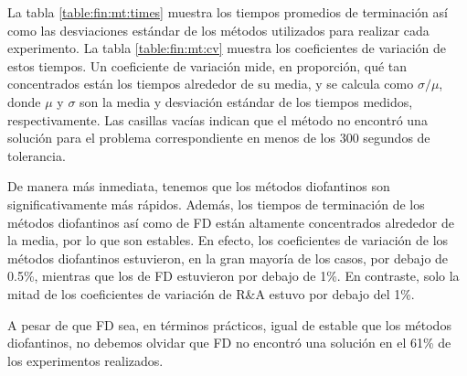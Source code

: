 La tabla \ref{table:fin:mt:times} muestra los tiempos promedios de terminación así como las
desviaciones estándar de los métodos utilizados para realizar cada experimento. La tabla
\ref{table:fin:mt:cv} muestra los coeficientes de variación de estos tiempos. Un coeficiente de
variación mide, en proporción, qué tan concentrados están los tiempos alrededor de su media, y se
calcula como $\sigma / \mu$, donde $\mu$ y $\sigma$ son la media y desviación estándar de los tiempos
medidos, respectivamente. Las casillas vacías indican que el método no encontró una solución para el
problema correspondiente en menos de los 300 segundos de tolerancia.

De manera más inmediata, tenemos que los métodos diofantinos son significativamente más rápidos.
Además, los tiempos de terminación de los métodos diofantinos así como de FD están altamente
concentrados alrededor de la media, por lo que son estables. En efecto, los coeficientes de
variación de los métodos diofantinos estuvieron, en la gran mayoría de los casos, por
debajo de 0.5\%, mientras que los de FD estuvieron por debajo de 1\%. En contraste, solo la mitad de
los coeficientes de variación de R\&A estuvo por debajo del 1\%.

A pesar de que FD sea, en términos prácticos, igual de estable que los métodos diofantinos, no
debemos olvidar que FD no encontró una solución en el 61\% de los experimentos realizados.

